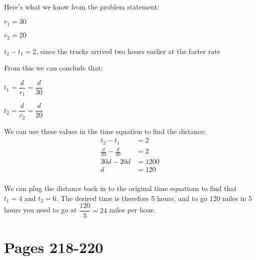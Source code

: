 \documentclass[fleqn,addpoints]{exam}
\begin{document}
\begin{solution}

Here's what we know from the problem statement:
\begin{itemize*}
  \item $r_1 = 30$
  \item $r_2 = 20$
  \item $t_2-t_1 = 2$, since the trucks arrived two hours earlier at the faster rate
\end{itemize*}

From this we can conclude that:
\begin{itemize*}
  \item $t_1 = \dfrac{d}{r_1} = \dfrac{d}{30}$
  \item $t_2 = \dfrac{d}{r_2} = \dfrac{d}{20}$
\end{itemize*}

We can use these values in the time equation to find the distance:
\begin{align*}
  t_2-t_1 &= 2 \\
  \frac{d}{20} - \frac{d}{30} &= 2 \\
  30d - 20d &= 1200 \\
  d &= 120 \\
\end{align*}

We can plug the distance back in to the original time equations to find that $t_1=4$ and $t_2=6$.  The desired time is
therefore 5 hours, and to go 120 miles in 5 hours you need to go at $\dfrac{120}{5} = 24$ miles per hour.

\end{solution}

\ifprintanswers

\section{Pages 218-220}
\end{document}
